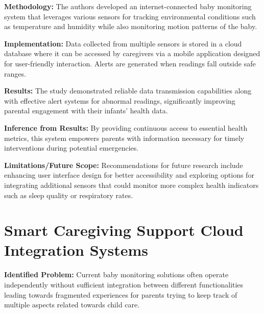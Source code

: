 \documentclass[12pt,a4paper]{report}
\begin{document}
\setlength{\parskip}{1em}  %


\noindent\textbf{Methodology:} The authors developed an internet-connected baby monitoring system that leverages various sensors for tracking environmental conditions such as temperature and humidity while also monitoring motion patterns of the baby.

\setlength{\parskip}{1em}  %


\noindent\textbf{Implementation:} Data collected from multiple sensors is stored in a cloud database where it can be accessed by caregivers via a mobile application designed for user-friendly interaction. Alerts are generated when readings fall outside safe ranges.
\setlength{\parskip}{1em}  %

\noindent\textbf{Results:} The study demonstrated reliable data transmission capabilities along with effective alert systems for abnormal readings, significantly improving parental engagement with their infants' health data.

\setlength{\parskip}{1em}  %


\noindent\textbf{Inference from Results:} By providing continuous access to essential health metrics, this system empowers parents with information necessary for timely interventions during potential emergencies.


\setlength{\parskip}{1em}  %

\noindent\textbf{Limitations/Future Scope:} Recommendations for future research include enhancing user interface design for better accessibility and exploring options for integrating additional sensors that could monitor more complex health indicators such as sleep quality or respiratory rates.
\setlength{\parskip}{1em}  %


\section{Smart Caregiving Support Cloud Integration Systems}
\textbf{Identified Problem:} Current baby monitoring solutions often operate independently without sufficient integration between different functionalities leading towards fragmented experiences for parents trying to keep track of multiple aspects related towards child care\cite{10578217}.

\setlength{\parskip}{1em}  %
\end{document}
